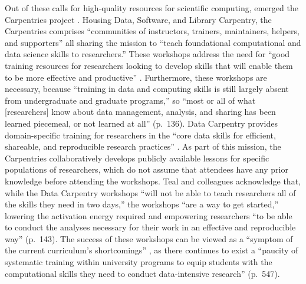 \documentclass[12pt]{article}
\begin{document}
\quad Out of these calls for high-quality resources for scientific computing, 
emerged the Carpentries project \citep{carpentries}. Housing Data, Software, and
Library Carpentry, the Carpentries comprises ``communities of instructors, 
trainers, maintainers, helpers, and supporters'' all sharing the mission to 
``teach foundational computational and data science skills to researchers.'' 
These workshops address the need for ``good training resources for researchers 
looking to develop skills that will enable them to be more effective and 
productive'' \citep[p.\ 135]{carpentries}. Furthermore, these workshops are 
necessary, because ``training in data and computing skills is still largely 
absent from undergraduate and graduate programs,'' so ``most or all of what 
[researchers] know about data management, analysis, and sharing has been learned
piecemeal, or not learned at all'' (p.\ 136). Data Carpentry provides 
domain-specific training for researchers in the ``core data skills for 
efficient, shareable, and reproducible research practices'' 
\citep{data-carpentry}.  As part of this mission, the Carpentries
collaboratively develops publicly available lessons for specific populations
of researchers, which do not assume that attendees have any prior knowledge
before attending the workshops. Teal and colleagues acknowledge that, while 
the Data Carpentry workshops ``will not be able to teach researchers all of the
skills they need in two days,'' the workshops ``are a way to get started,''  
lowering the activation energy required and empowering researchers ``to be able
to conduct the analyses necessary for their work in an effective and 
reproducible way'' (p.\ 143). The success of these workshops can be viewed as 
a ``symptom of the current curriculum's shortcomings'' \citep[p.\ 547]{hampton}, 
as there continues to exist a ``paucity of systematic training within university
programs to equip students with the computational skills they need to conduct 
data-intensive research'' (p.\ 547). 
\end{document}
